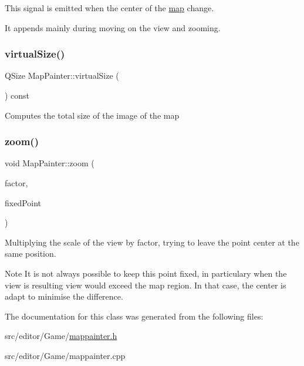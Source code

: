 This signal is emitted when the center of the \hyperlink{class_map}{map} change.

It appends mainly during moving on the view and zooming. \hypertarget{class_map_painter_a49be79b1a7ac1edc703aa3fd954f80d6}{}\label{class_map_painter_a49be79b1a7ac1edc703aa3fd954f80d6} 
\subsubsection{\texorpdfstring{virtual\+Size()}{virtualSize()}}
{\footnotesize\ttfamily Q\+Size Map\+Painter\+::virtual\+Size (\begin{DoxyParamCaption}{ }\end{DoxyParamCaption}) const}

Computes the total size of the image of the map \hypertarget{class_map_painter_a2dacde51513a54fbbf45b44787cd0ee2}{}\label{class_map_painter_a2dacde51513a54fbbf45b44787cd0ee2} 
\subsubsection{\texorpdfstring{zoom()}{zoom()}}
{\footnotesize\ttfamily void Map\+Painter\+::zoom (\begin{DoxyParamCaption}\item[{double}]{factor,  }\item[{Q\+PointF}]{fixed\+Point }\end{DoxyParamCaption})}

Multiplying the scale of the view by factor, trying to leave the point center at the same position. \begin{DoxyNote}{Note}
It is not always possible to keep this point fixed, in particulary when the view is resulting view would exceed the map region. In that case, the center is adapt to minimise the difference. 
\end{DoxyNote}


The documentation for this class was generated from the following files\+:\begin{DoxyCompactItemize}
\item 
src/editor/\+Game/\hyperlink{mappainter_8h}{mappainter.\+h}\item 
src/editor/\+Game/mappainter.\+cpp\end{DoxyCompactItemize}
